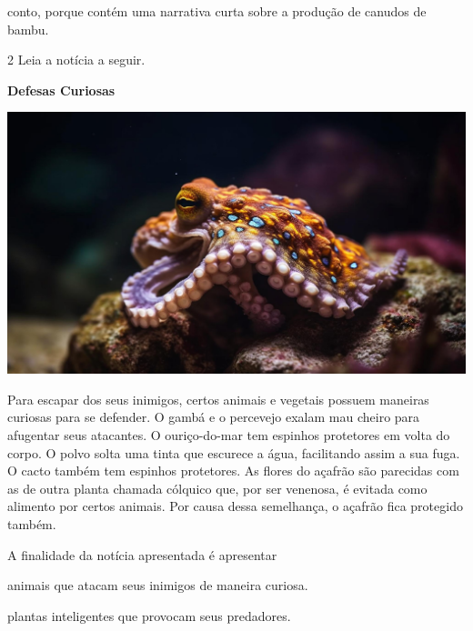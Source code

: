 \begin{conteudo}
\begin{conteudo}
\begin{conteudo}
\begin{conteudo}
\begin{escolha}
\item conto, porque contém uma narrativa curta sobre a produção de canudos de bambu.
\end{escolha}

\num{2} Leia a notícia a seguir.

\begin{myquote}
\textbf{Defesas Curiosas}

\begin{center}
\noindent\includegraphics[width=\textwidth]{media/image20d.jpg}
\end{center}

Para escapar dos seus inimigos, certos animais e vegetais possuem
maneiras curiosas para se defender. O gambá e o percevejo exalam mau
cheiro para afugentar seus atacantes. O ouriço-do-mar tem espinhos
protetores em volta do corpo. O polvo solta uma tinta que escurece a
água, facilitando assim a sua fuga. O cacto também tem espinhos
protetores. As flores do açafrão são parecidas com as de outra planta
chamada cólquico que, por ser venenosa, é evitada como alimento por
certos animais. Por causa dessa semelhança, o açafrão fica protegido
também.

\end{myquote}

A finalidade da notícia apresentada é apresentar

\begin{escolha}
\item animais que atacam seus inimigos de maneira curiosa.

\item plantas inteligentes que provocam seus predadores.


\end{escolha}
\end{conteudo}
\end{conteudo}
\end{conteudo}
\end{conteudo}
